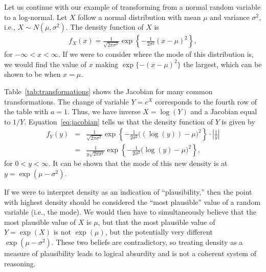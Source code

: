 \documentclass[man]{apa}
\newcommand{\ora}[1]{{#1}}
\newcommand{\blu}[1]{{#1}}
\begin{document}
Let us continue with our example of transforming from a normal random variable to a log-normal. Let $X$ follow a normal distribution with mean $\mu$ and variance $\sigma^2$, i.e., $X\sim N(\mu,\sigma^2)$. The density function of $X$ is 
\begin{eqnarray*}
f_X(x) = \frac{1}{\sqrt{2\pi\sigma^2}}\exp\left\{-\frac{1}{2\sigma^2}(x-\mu)^2\right\},
\end{eqnarray*}
for $-\infty < x < \infty$. If we were to consider where the mode of this distribution is, we would find the value of $x$ making $\exp\{-(x-\mu)^2\}$ the largest, which can be shown to be when $x=\mu$.  

Table~\ref{tab:transformations} shows the Jacobian for many common transformations. The change of variable $Y=e^X$ corresponds to the fourth row of the table with $a=1$. Thus, we have inverse $X=\log(Y)$ and a Jacobian equal to $1/Y$. Equation~\ref{eq:jacobian} tells us that the density function of $Y$ is given by
\begin{eqnarray*}
f_Y(y) &=&  \frac{1}{\sqrt{2\pi\sigma^2}}\exp\left\{-\frac{1}{2\sigma^2}\Big(\left(\ora{\log(y)}\right)-\mu\Big)^2\right\}\cdot\left|\blu{\frac{1}{y}}\right|\\
&=& \frac{1}{\blu{y}\sqrt{2\pi\sigma^2}}\exp\left\{-\frac{1}{2\sigma^2}\Big(\ora{\log(y)}-\mu\Big)^2\right\},
\end{eqnarray*}
for $0<y<\infty$. It can be shown that the mode of this new density is at $y=\exp{(\mu-\sigma^2)}$. 

If we were to interpret density as an indication of ``plausibility,'' then the point with highest density should be considered the ``most plausible'' value of a random variable (i.e., the mode). We would then have to simultaneously believe that the most plausible value of $X$ is $\mu$, but that the most plausible value of $Y=\exp{(X)}$ is not $\exp{(\mu)}$, but the potentially very different $\exp{(\mu-\sigma^2)}$. These two beliefs are contradictory, so treating density as a measure of plausibility leads to logical absurdity and is not a coherent system of reasoning.
\end{document}
